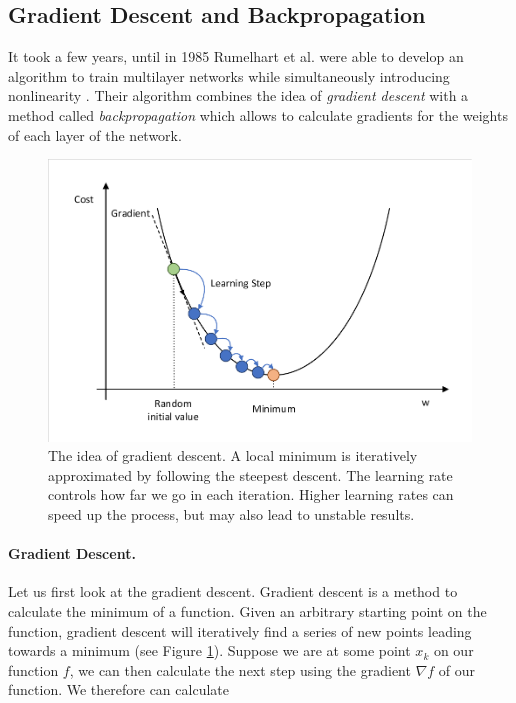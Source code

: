 \subsection{Gradient Descent and Backpropagation} \label{sec:Backpropagation}
It took a few years, until in 1985 Rumelhart et al. were able to develop an algorithm to train multilayer networks while simultaneously introducing nonlinearity \cite{rumelhart1985learning}. Their algorithm combines the idea of \textit{gradient descent} with a method called \textit{backpropagation} which allows to calculate gradients for the weights of each layer of the network.

\begin{figure}[ht]
  
  \begin{center}
      \includegraphics[trim=10px 10px 10px 10px, clip, width=0.75\columnwidth]{figures/deeplearning/GradientDescent.pdf}
  \end{center}
  
  \caption[Gradient Descent]{The idea of gradient descent. A local minimum is iteratively approximated by following the steepest descent. The learning rate controls how far we go in each iteration. Higher learning rates can speed up the process, but may also lead to unstable results.}
  \label{fig:GradientDescent}
  \vspace*{-10pt}
\end{figure}

\paragraph{Gradient Descent.} Let us first look at the gradient descent. Gradient descent is a method to calculate the minimum of a function. Given an arbitrary starting point on the function, gradient descent will iteratively find a series of new points leading towards a minimum (see Figure \ref{fig:GradientDescent}). Suppose we are at some point $x_k$ on our function $f$, we can then calculate the next step using the gradient $\nabla f$ of our function. We therefore can calculate 

